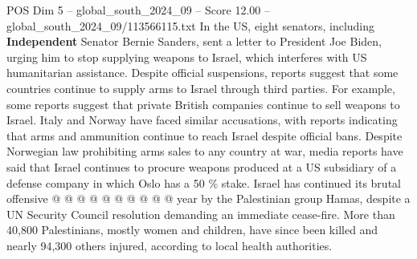 \begin{textsample}{POS Dim 5 – global\_south\_2024\_09 – Score 12.00 – global\_south\_2024\_09/113566115.txt}
In the US, eight senators, including \textbf{Independent} Senator Bernie Sanders, sent a letter to President Joe Biden, urging him to stop supplying weapons to Israel, which interferes with US humanitarian assistance.
Despite official suspensions, reports suggest that some countries continue to supply arms to Israel through third parties.
For example, some reports suggest that private British companies continue to sell weapons to Israel.
Italy and Norway have faced similar accusations, with reports indicating that arms and ammunition continue to reach Israel despite official bans.
Despite Norwegian law prohibiting arms sales to any country at war, media reports have said that Israel continues to procure weapons produced at a US subsidiary of a defense company in which Oslo has a 50 \% stake.
Israel has continued its brutal offensive @ @ @ @ @ @ @ @ @ @ year by the Palestinian group Hamas, despite a UN Security Council resolution demanding an immediate cease-fire.
More than 40,800 Palestinians, mostly women and children, have since been killed and nearly 94,300 others injured, according to local health authorities.

\end{textsample}

